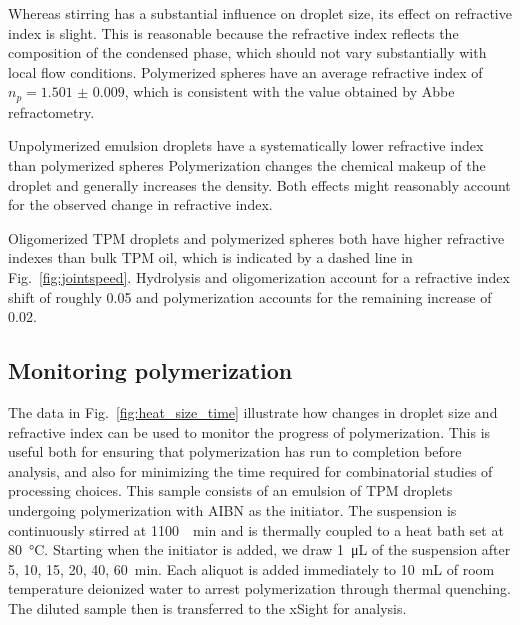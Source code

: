 \documentclass[journal=langd5,manuscript=article]{achemso}
\begin{document}
Whereas stirring has a substantial influence on droplet size,
its effect on refractive index is slight.
This is reasonable because the refractive index reflects
the composition of the condensed phase, which should not
vary substantially with local flow conditions.
Polymerized spheres have an average refractive index of
$n_p = \num{1.501(9)}$, which is consistent with the value
obtained by Abbe refractometry.

Unpolymerized emulsion droplets have a systematically 
lower refractive index than polymerized spheres
Polymerization changes the chemical makeup of the droplet and
generally increases the density. %
Both effects might reasonably account for the observed change in refractive index.

Oligomerized TPM droplets and polymerized spheres both
have higher refractive indexes than bulk TPM oil, which is indicated by
a dashed line in Fig.~\ref{fig:jointspeed}.
Hydrolysis and oligomerization account for a refractive
index shift of roughly \num{0.05} and polymerization accounts for the remaining
increase of \num{0.02}.

\subsection{Monitoring polymerization}
\label{sec:monitoring}

The data in Fig.~\ref{fig:heat_size_time}
illustrate how changes in droplet size and refractive index can be
used to monitor the progress of polymerization.
This is useful both for ensuring that polymerization has run
to completion before analysis, and also for minimizing the
time required for combinatorial studies of processing choices.
This sample consists of an emulsion of TPM droplets undergoing
polymerization with AIBN as the initiator.
The suspension is continuously stirred at 
\SI{1100}{\per\minute}
and is thermally coupled to a heat bath set at \SI{80}{\degreeCelsius}.
Starting when the initiator is added,
we draw \SI{1}{\micro\liter} of the suspension after 
\num{5}, \num{10}, \num{15},
\num{20}, \num{40}, \SI{60}{\minute}.
Each aliquot is added immediately 
to \SI{10}{\milli\liter} of room temperature deionized water
to arrest polymerization through thermal quenching.
The diluted sample then is transferred to the xSight
for analysis.
\end{document}
